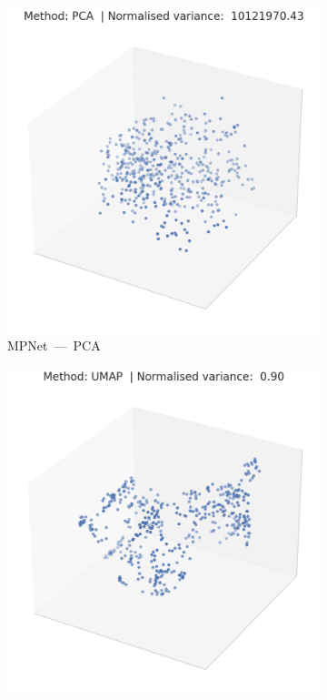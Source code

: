 \documentclass[10pt,oneside]{report}
\begin{document}
\begin{figure}[htbp]
  \centering
  \begin{subfigure}[b]{0.48\textwidth}
    \centering
    \includegraphics[width=\textwidth]{pcaTestMPNet.png}
    \caption{MPNet --- PCA}
    \label{fig:pcaTest-mpnet}
  \end{subfigure}%
  \hfill
  \begin{subfigure}[b]{0.48\textwidth}
    \centering
    \includegraphics[width=\textwidth]{umapTestMPNet.png}

\end{subfigure}
\end{figure}
\end{document}
